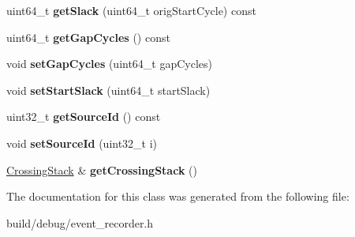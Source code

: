 \begin{DoxyCompactItemize}
\item 
\hypertarget{classEventRecorder_a40ad92b26f50d5bae3daabe6c9485d19}{uint64\-\_\-t {\bfseries get\-Slack} (uint64\-\_\-t orig\-Start\-Cycle) const }\label{classEventRecorder_a40ad92b26f50d5bae3daabe6c9485d19}

\item 
\hypertarget{classEventRecorder_a49733c855c908748a220eaa61371bf8b}{uint64\-\_\-t {\bfseries get\-Gap\-Cycles} () const }\label{classEventRecorder_a49733c855c908748a220eaa61371bf8b}

\item 
\hypertarget{classEventRecorder_a738bacb75d4ae584eb44fa9dcba6ee7a}{void {\bfseries set\-Gap\-Cycles} (uint64\-\_\-t gap\-Cycles)}\label{classEventRecorder_a738bacb75d4ae584eb44fa9dcba6ee7a}

\item 
\hypertarget{classEventRecorder_a4a5078b32b484226d921538054fee4e8}{void {\bfseries set\-Start\-Slack} (uint64\-\_\-t start\-Slack)}\label{classEventRecorder_a4a5078b32b484226d921538054fee4e8}

\item 
\hypertarget{classEventRecorder_a825338b237bcd7ae9f7f65477a489a6f}{uint32\-\_\-t {\bfseries get\-Source\-Id} () const }\label{classEventRecorder_a825338b237bcd7ae9f7f65477a489a6f}

\item 
\hypertarget{classEventRecorder_a9c079787b3c2284d1defde04be45446f}{void {\bfseries set\-Source\-Id} (uint32\-\_\-t i)}\label{classEventRecorder_a9c079787b3c2284d1defde04be45446f}

\item 
\hypertarget{classEventRecorder_a37ec484c1773fbbb837c0ed5cf37acab}{\hyperlink{classg__vector}{Crossing\-Stack} \& {\bfseries get\-Crossing\-Stack} ()}\label{classEventRecorder_a37ec484c1773fbbb837c0ed5cf37acab}

\end{DoxyCompactItemize}


The documentation for this class was generated from the following file\-:\begin{DoxyCompactItemize}
\item 
build/debug/event\-\_\-recorder.\-h\end{DoxyCompactItemize}
